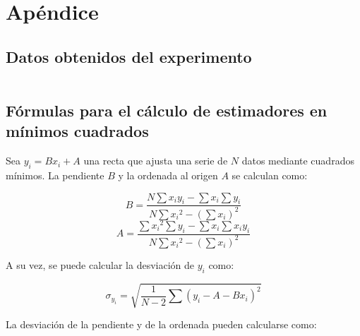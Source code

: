 \section{Apéndice}
\label{sec:apendice}


\subsection{Datos obtenidos del experimento}

\begin{table}
    \footnotesize
    \centering
    \begin{tabular}{r|rrrr}\toprule
        
    \end{tabular}
\end{table}

\subsection{Fórmulas para el cálculo de estimadores en mínimos cuadrados}
\label{sec:apendice:formulas-estimadores-mc}

Sea $y_i = Bx_i + A$ una recta que ajusta una serie de $N$ datos mediante
cuadrados mínimos. La pendiente $B$ y la ordenada al origen $A$ se calculan
como:

\newcommand{\denominador}{N \sum {x_i}^2 - \left( \sum x_i \right)^2} 

\begin{equation}
    \label{ec:apendice:pendiente-mc}
    B = \frac{ N \sum x_i y_i - \sum x_i \sum y_i }
             { \denominador }
\end{equation}
\vspace{5mm}
\begin{equation}
    \label{ec:apendice:ordenada-mc}
    A = \frac{ \sum {x_i}^2 \sum y_i - \sum x_i \sum x_i y_i}
             { \denominador }
\end{equation}
\vspace{5mm}

A su vez, se puede calcular la desviación de $y_i$ como:

\begin{equation}
    \label{ec:apendice:desviacion-y-mc}
    \sigma_{y_i} = \sqrt{ \frac{1}{N-2} \sum 
                          \left( y_i - A - B x_i \right)^2 }
\end{equation}

\vspace{5mm}
La desviación de la pendiente y de la ordenada pueden calcularse como:

